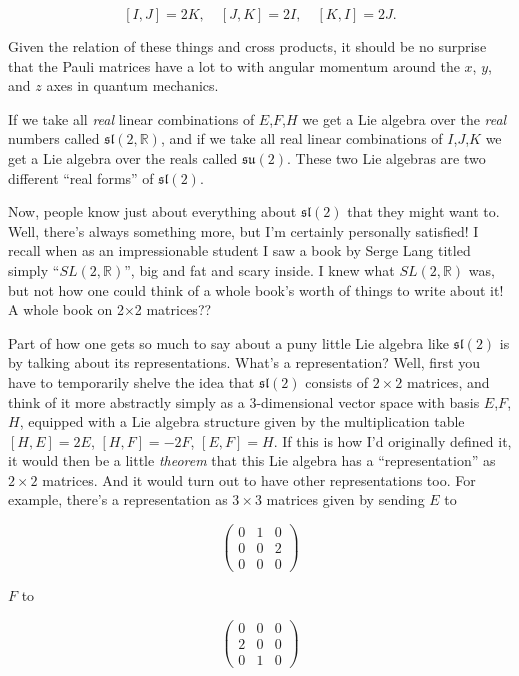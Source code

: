 \documentclass{article}
\begin{document}
\[[I,J] = 2K, \quad [J,K] = 2I, \quad [K,I] = 2J.\]

Given the relation of these things and cross products, it should be no
surprise that the Pauli matrices have a lot to with angular momentum
around the \(x\), \(y\), and \(z\) axes in quantum mechanics.

If we take all \emph{real} linear combinations of \(E\),\(F\),\(H\) we
get a Lie algebra over the \emph{real} numbers called
\(\mathfrak{sl}(2,\mathbb{R})\), and if we take all real linear
combinations of \(I\),\(J\),\(K\) we get a Lie algebra over the reals
called \(\mathfrak{su}(2)\). These two Lie algebras are two different
``real forms'' of \(\mathfrak{sl}(2)\).

Now, people know just about everything about \(\mathfrak{sl}(2)\) that
they might want to. Well, there's always something more, but I'm
certainly personally satisfied! I recall when as an impressionable
student I saw a book by Serge Lang titled simply
``\(SL(2,\mathbb{R})\)'', big and fat and scary inside. I knew what
\(SL(2,\mathbb{R})\) was, but not how one could think of a whole book's
worth of things to write about it! A whole book on 2×2 matrices??

Part of how one gets so much to say about a puny little Lie algebra like
\(\mathfrak{sl}(2)\) is by talking about its representations. What's a
representation? Well, first you have to temporarily shelve the idea that
\(\mathfrak{sl}(2)\) consists of \(2\times2\) matrices, and think of it
more abstractly simply as a 3-dimensional vector space with basis
\(E\),\(F\),\(H\), equipped with a Lie algebra structure given by the
multiplication table \([H,E] = 2E\), \([H,F] = -2F\), \([E,F] = H\). If
this is how I'd originally defined it, it would then be a little
\emph{theorem} that this Lie algebra has a ``representation'' as
\(2\times2\) matrices. And it would turn out to have other
representations too. For example, there's a representation as
\(3\times3\) matrices given by sending \(E\) to

\[\left(\begin{array}{ccc}0&1&0\\0&0&2\\0&0&0\end{array}\right)\]

\(F\) to

\[\left(\begin{array}{ccc}0&0&0\\2&0&0\\0&1&0\end{array}\right)\]
\end{document}
